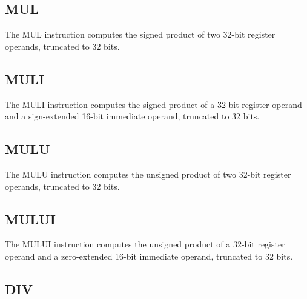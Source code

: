 

\subsection{MUL}

The MUL instruction computes the signed product of two 32-bit register operands, truncated to 32 bits.\\



\subsection{MULI}

The MULI instruction computes the signed product of a 32-bit register operand and a sign-extended 16-bit immediate operand, truncated to 32 bits.\\



\subsection{MULU}

The MULU instruction computes the unsigned product of two 32-bit register operands, truncated to 32 bits.\\



\subsection{MULUI}

The MULUI instruction computes the unsigned product of a 32-bit register operand and a zero-extended 16-bit immediate operand, truncated to 32 bits.\\



\subsection{DIV}

